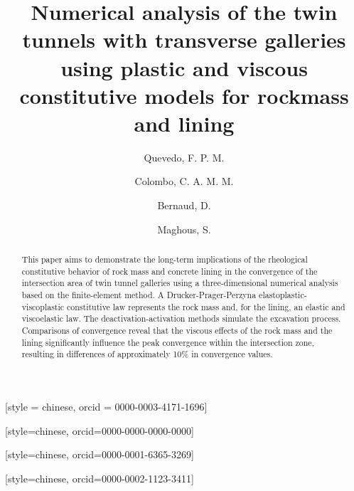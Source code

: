 \documentclass[a4paper,fleqn]{cas-sc}
\begin{document}
\let\WriteBookmarks\relax
\def\floatpagepagefraction{1}
\def\textpagefraction{.001}



\title [mode = title]{Numerical analysis of the twin tunnels with transverse galleries using plastic and viscous 
	constitutive models for rockmass and lining}  

\author[1]{Quevedo, F. P. M.}[style = chinese, orcid = 0000-0003-4171-1696]
\cormark[1] 					

\author[1]{Colombo, C. A. M. M.}[style=chinese, orcid=0000-0000-0000-0000]

\author[1]{Bernaud, D.}[style=chinese, orcid=0000-0001-6365-3269]

\author[1]{Maghous, S.}[style=chinese, orcid=0000-0002-1123-3411]


\begin{abstract}
This paper aims to demonstrate the long-term implications of the rheological constitutive behavior of rock mass and concrete lining in the convergence of the intersection area of twin tunnel galleries using a three-dimensional numerical analysis based on the finite-element method. A Drucker-Prager-Perzyna elastoplastic-viscoplastic constitutive law represents the rock mass and, for the lining, an elastic and viscoelastic law. The deactivation-activation methods simulate the excavation process. Comparisons of convergence reveal that the viscous effects of the rock mass and the lining significantly influence the peak convergence within the intersection zone, resulting in differences of approximately 10\% in convergence values.
\end{abstract}
\end{document}
